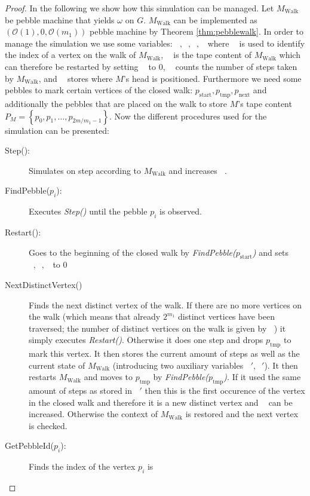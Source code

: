 \documentclass[oneside]{scrartcl}
\DeclareMathOperator{\Tid}{T_{\text{id}}}
\DeclareMathOperator{\Tsteps}{T_{\text{steps}}}
\DeclareMathOperator{\Twalk}{T_{\text{walk}}}
\DeclareMathOperator{\Thead}{T_{\text{head}}}
\begin{document}
\begin{proof}
  In the following we show how this simulation can be managed.
  Let $M_{\text{Walk}}$ be pebble machine that yields $\omega$ on $G$.
  $M_{\text{Walk}}$ can be implemented as $(\mathcal{O}(1),0,\mathcal{O}(m_{1}))$
  pebble machine by Theorem \ref{thm:pebblewalk}.
  In order to manage the simulation we use some
  variables: $\Tid, \Tsteps, \Twalk, \Thead$ where $\Tid$ is used to identify
  the index of a vertex on the walk of $M_{\text{Walk}}$, $\Twalk$ is the tape
  content of $M_{\text{Walk}}$ which can therefore be restarted by setting
  $\Twalk$ to 0, $\Tsteps$ counts the number of steps taken by
  $M_{\text{Walk}}$, and $\Thead$ stores where $M$'s head is positioned.
  Furthermore we need some pebbles to mark certain vertices of the closed walk:
  $p_{\text{start}}, p_{\text{tmp}}, p_{\text{next}}$ and additionally the
  pebbles that are placed on the walk to store $M$'s tape content
  $P_{M} = \left\{p_{0},p_{1},\dots,p_{2m/m_{1}-1}\right\}$.
  Now the different procedures used for the simulation can be presented:
  \begin{description}
    \item[Step():] Simulates on step according to $M_{\text{Walk}}$ and
      increases $\Tsteps$.
    \item[FindPebble($p_{i}$):] Executes \emph{Step()} until the pebble $p_{i}$
      is observed.
    \item[Restart():] Goes to the beginning of the closed walk by
      \emph{FindPebble($p_{\text{start}}$)} and sets $\Tsteps,\Tid,\Twalk$ to 0
    \item[NextDistinctVertex()] Finds the next distinct vertex of the walk. If
      there are no more vertices on the walk (which means that already
      $2^{m_1}$ distinct vertices have been traversed; the number of distinct
      vertices on the walk is given by $\Tid$) it simply executes
      \emph{Restart()}. Otherwise it does one step and drops $p_{\text{tmp}}$
      to mark this vertex. It then stores the current amount of steps as well
      as the current state of $M_{\text{Walk}}$ (introducing two auxiliary
      variables $\Tsteps',\Twalk'$). It then restarts $M_{\text{Walk}}$ and
      moves to $p_{\text{tmp}}$ by \emph{FindPebble($p_{\text{tmp}}$)}. If
      it used the same amount of steps as stored in $\Tsteps'$ then this is the
      first occurence of the vertex in the closed walk and therefore it is a
      new distinct vertex and $\Tid$ can be increased. Otherwise the context of
      $M_{\text{Walk}}$ is restored and the next vertex is checked.
    \item[GetPebbleId($p_{i}$):] Finds the index of the vertex $p_{i}$ is

\end{description}
\end{proof}
\end{document}
